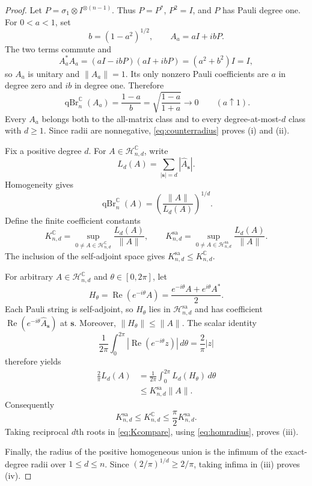 \documentclass[11pt]{article}
\theoremstyle{remark}
\newcommand{\C}{\mathbb C}
\newcommand{\qBr}{\operatorname{qBr}}
\newcommand{\sa}{\mathrm{sa}}
\begin{document}
\begin{proof}
Let $P=\sigma_1\otimes I^{\otimes(n-1)}$.  Thus $P=P^*$,
$P^2=I$, and $P$ has Pauli degree one.  For $0<a<1$, set
\[
 b=(1-a^2)^{1/2},\qquad A_a=aI+ibP.
\]
The two terms commute and
\[
 A_a^*A_a=(aI-ibP)(aI+ibP)=(a^2+b^2)I=I,
\]
so $A_a$ is unitary and $\|A_a\|=1$.  Its only nonzero Pauli
coefficients are $a$ in degree zero and $ib$ in degree one.  Therefore
\begin{equation}\label{eq:counterradius}
 \qBr_n^{\C}(A_a)=\frac{1-a}{b}
 =\sqrt{\frac{1-a}{1+a}}\longrightarrow0
 \qquad(a\uparrow1).
\end{equation}
Every $A_a$ belongs both to the all-matrix class and to every
degree-at-most-$d$ class with $d\geq1$.  Since radii are nonnegative,
\eqref{eq:counterradius} proves (i) and (ii).

Fix a positive degree $d$.  For $A\in\mathcal H_{n,d}^{\C}$, write
\[
 L_d(A)=\sum_{|\mathbf s|=d}|\widehat A_{\mathbf s}|.
\]
Homogeneity gives
\begin{equation}\label{eq:homradius}
 \qBr_n^{\C}(A)=\left(\frac{\|A\|}{L_d(A)}\right)^{1/d}.
\end{equation}
Define the finite coefficient constants
\[
 K_{n,d}^{\C}=\sup_{0\ne A\in\mathcal H_{n,d}^{\C}}
 \frac{L_d(A)}{\|A\|},
 \qquad
 K_{n,d}^{\sa}=\sup_{0\ne A\in\mathcal H_{n,d}^{\sa}}
 \frac{L_d(A)}{\|A\|}.
\]
The inclusion of the self-adjoint space gives
$K_{n,d}^{\sa}\leq K_{n,d}^{\C}$.

For arbitrary $A\in\mathcal H_{n,d}^{\C}$ and $\theta\in[0,2\pi]$, let
\[
 H_\theta=\operatorname{Re}(e^{-i\theta}A)
 =\frac{e^{-i\theta}A+e^{i\theta}A^*}{2}.
\]
Each Pauli string is self-adjoint, so $H_\theta$ lies in
$\mathcal H_{n,d}^{\sa}$ and has coefficient
$\operatorname{Re}(e^{-i\theta}\widehat A_{\mathbf s})$ at $\mathbf s$.
Moreover, $\|H_\theta\|\leq\|A\|$.  The scalar identity
\begin{equation}\label{eq:phaseaverage}
 \frac1{2\pi}\int_0^{2\pi}
 \left|\operatorname{Re}(e^{-i\theta}z)\right|\,d\theta
 =\frac2\pi|z|
\end{equation}
therefore yields
\begin{align*}
 \frac2\pi L_d(A)
 &=\frac1{2\pi}\int_0^{2\pi}L_d(H_\theta)\,d\theta\\
 &\leq K_{n,d}^{\sa}\|A\|.
\end{align*}
Consequently
\begin{equation}\label{eq:Kcompare}
 K_{n,d}^{\sa}\leq K_{n,d}^{\C}
 \leq\frac\pi2K_{n,d}^{\sa}.
\end{equation}
Taking reciprocal $d$th roots in \eqref{eq:Kcompare}, using
\eqref{eq:homradius}, proves (iii).

Finally, the radius of the positive homogeneous union is the infimum of the
exact-degree radii over $1\leq d\leq n$.  Since
$(2/\pi)^{1/d}\geq2/\pi$, taking infima in (iii) proves (iv).
\end{proof}
\end{document}
